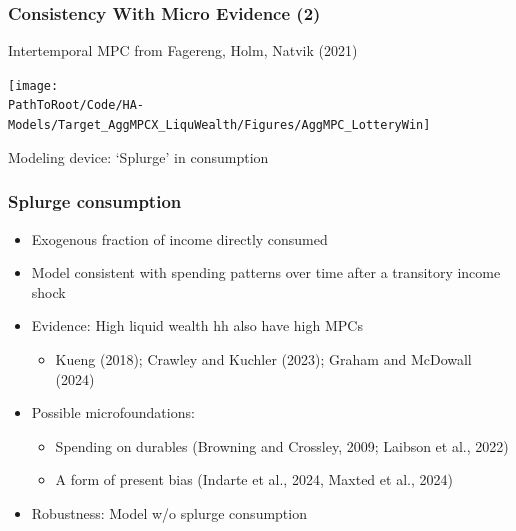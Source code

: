 \documentclass[pdflatex,aspectratio=169]{beamer}
\begin{document}
\begin{frame}
  \frametitle{Consistency With Micro Evidence (2)}
  Intertemporal MPC from Fagereng, Holm, Natvik (2021)
  \begin{center}
    \texttt{[image: \\PathToRoot/Code/HA-Models/Target\_AggMPCX\_LiquWealth/Figures/AggMPC\_LotteryWin]}
  \end{center}
  Modeling device: `Splurge' in consumption
\end{frame}

\begin{frame}
  \frametitle{Splurge consumption}
  \begin{itemize}
    \itemsep = .75\bigskipamount
    \item
          Exogenous fraction of income directly consumed
    \item
          Model consistent with spending patterns over time after a transitory income shock
    \item
          Evidence: High liquid wealth hh also have high MPCs
          \begin{itemize}
            \itemsep = .25\bigskipamount
            \item
                  Kueng (2018); Crawley and Kuchler (2023); Graham and McDowall (2024)
          \end{itemize}
    \item
          Possible microfoundations:
          \begin{itemize}
            \itemsep = .25\bigskipamount
            \item
                  Spending on durables (Browning and Crossley, 2009; Laibson et al., 2022)
            \item
                  A form of present bias (Indarte et al., 2024, Maxted et al., 2024)
          \end{itemize}
    \item
          Robustness: Model w/o splurge consumption
  \end{itemize}
\end{frame}
\end{document}

